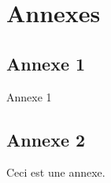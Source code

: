 \appendix
\chapter*{Annexes}
\renewcommand{\thesection}{\Alph{section}}

\section{Annexe 1}
\label{appendix:1}
Annexe 1

\newpage

\section{Annexe 2}
\label{appendix:2}
Ceci est une annexe.
